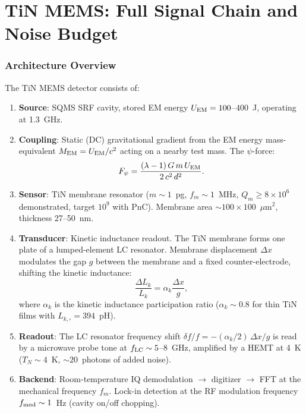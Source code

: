 \documentclass[11pt]{article}
\newcommand{\ee}[1]{\times 10^{#1}}
\theoremstyle{definition}
\theoremstyle{remark}
\begin{document}
\part{TiN MEMS: Full Signal Chain and Noise Budget}
\label{part:tin}


\section{Architecture Overview}

The TiN MEMS detector consists of:

\begin{enumerate}
\item \textbf{Source}: SQMS SRF cavity, stored EM energy $U_{\rm EM}
  = 100$--$400$~J, operating at 1.3~GHz.

\item \textbf{Coupling}: Static (DC) gravitational gradient from
  the EM energy mass-equivalent $M_{\rm EM} = U_{\rm EM}/c^2$
  acting on a nearby test mass. The $\psi$-force:
  \begin{equation}
  F_\psi = \frac{(\lambda-1)\,G\,m\,U_{\rm EM}}{2\,c^2\,d^2}.
  \end{equation}

\item \textbf{Sensor}: TiN membrane resonator ($m \sim 1$~pg,
  $f_m \sim 1$~MHz, $Q_m \geq 8\ee{6}$ demonstrated, target $10^9$
  with PnC). Membrane area $\sim 100 \times 100$~$\mu$m$^2$,
  thickness 27--50~nm.

\item \textbf{Transducer}: Kinetic inductance readout. The TiN
  membrane forms one plate of a lumped-element LC resonator.
  Membrane displacement $\Delta x$ modulates the gap $g$ between
  the membrane and a fixed counter-electrode, shifting the
  kinetic inductance:
  \begin{equation}
  \frac{\Delta L_k}{L_k} = \alpha_k \frac{\Delta x}{g},
  \end{equation}
  where $\alpha_k$ is the kinetic inductance participation ratio
  ($\alpha_k \sim 0.8$ for thin TiN films with
  $L_{k,\square} = 394$~pH).

\item \textbf{Readout}: The LC resonator frequency shift
  $\delta f/f = -(\alpha_k/2)\,\Delta x/g$ is read by a microwave
  probe tone at $f_{\rm LC} \sim 5$--$8$~GHz, amplified by a HEMT
  at 4~K ($T_N \sim 4$~K, $\sim 20$~photons of added noise).

\item \textbf{Backend}: Room-temperature IQ demodulation $\to$
  digitizer $\to$ FFT at the mechanical frequency $f_m$.
  Lock-in detection at the RF modulation frequency $f_{\rm mod}
  \sim 1$~Hz (cavity on/off chopping).
\end{enumerate}
\end{document}
